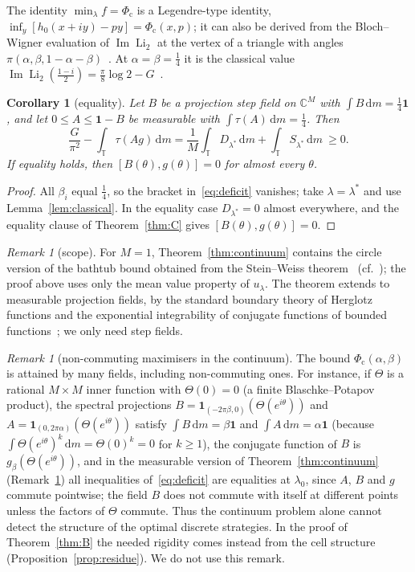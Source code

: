 \documentclass[11pt]{amsart}
\newtheorem{corollary}[theorem]{Corollary}
\theoremstyle{definition}
\theoremstyle{remark}
\newtheorem{remark}[theorem]{Remark}
\numberwithin{equation}{section}
\newcommand{\C}{\mathbb{C}}
\newcommand{\T}{\mathbb{T}}
\renewcommand{\Im}{\operatorname{Im}}
\newcommand{\Li}{\operatorname{Li}_2}
\newcommand{\one}{\mathbf{1}}
\newcommand{\Phic}{\Phi_{\mathrm c}}
\newcommand{\dd}{\,\mathrm{d}}
\begin{document}
The identity $\min_\lambda f=\Phic$ is a Legendre-type identity, $\inf_y[h_0(x+iy)-py]=\Phic(x,p)$; it can also be derived
from the Bloch--Wigner evaluation of $\Im\Li$ at the vertex of a triangle with angles
$\pi(\alpha,\beta,1-\alpha-\beta)$~\cite{Zagier}. At $\alpha=\beta=\frac14$ it is the classical value
$\Im\Li(\frac{1-i}2)=\frac\pi8\log2-G$~\cite{Lewin}.

\begin{corollary}[equality]\label{cor:equality}
Let $B$ be a projection step field on $\C^M$ with $\int B\dd m=\frac14\one$, and let $0\le A\le\one-B$ be measurable with
$\int\tau(A)\dd m=\frac14$. Then
\[
\frac{G}{\pi^2}-\int_\T\tau(Ag)\dd m=\frac1M\int_\T D_{\lambda^*}\dd m+\int_\T S_{\lambda^*}\dd m\ \ge0 .
\]
If equality holds, then $[B(\theta),g(\theta)]=0$ for almost every $\theta$.
\end{corollary}

\begin{proof}
All $\beta_i$ equal $\frac14$, so the bracket in~\eqref{eq:deficit} vanishes; take $\lambda=\lambda^*$ and use
Lemma~\ref{lem:classical}. In the equality case $D_{\lambda^*}=0$ almost everywhere, and the equality clause of
Theorem~\ref{thm:C} gives $[B(\theta),g(\theta)]=0$.
\end{proof}

\begin{remark}[scope]\label{rem:measurable}
For $M=1$, Theorem~\ref{thm:continuum} contains the circle version of the bathtub bound obtained from the Stein--Weiss
theorem~\cite{SW,Laeng} (cf.~\cite[Proposition~4.6]{MS-classical}); the proof above uses only the mean value property of
$u_\lambda$. The theorem extends to measurable projection fields, by the standard boundary theory of Herglotz functions
and the exponential integrability of conjugate functions of bounded functions~\cite{Zygmund}; we only need step fields.
\end{remark}

\begin{remark}[non-commuting maximisers in the continuum]\label{rem:degenerate}
The bound $\Phic(\alpha,\beta)$ is attained by many fields, including non-commuting ones. For instance, if $\Theta$ is a
rational $M\times M$ inner function with $\Theta(0)=0$ (a finite Blaschke--Potapov product), the spectral projections
$B=\one_{(-2\pi\beta,0)}(\Theta(e^{i\theta}))$ and $A=\one_{(0,2\pi\alpha)}(\Theta(e^{i\theta}))$ satisfy $\int B\dd m=\beta\one$ and
$\int A\dd m=\alpha\one$ (because $\int\Theta(e^{i\theta})^k\dd m=\Theta(0)^k=0$ for $k\ge1$), the conjugate function of $B$ is
$g_\beta(\Theta(e^{i\theta}))$, and in the measurable version of Theorem~\ref{thm:continuum} (Remark~\ref{rem:measurable})
all inequalities of~\eqref{eq:deficit} are equalities at $\lambda_0$, since $A$, $B$ and $g$ commute pointwise; the field $B$ does not
commute with itself at different points unless the factors of $\Theta$ commute. Thus the continuum problem alone
cannot detect the structure of the optimal discrete strategies. In the proof of Theorem~\ref{thm:B} the needed
rigidity comes instead from the cell structure (Proposition~\ref{prop:residue}). We do not use this remark.
\end{remark}
\end{document}
